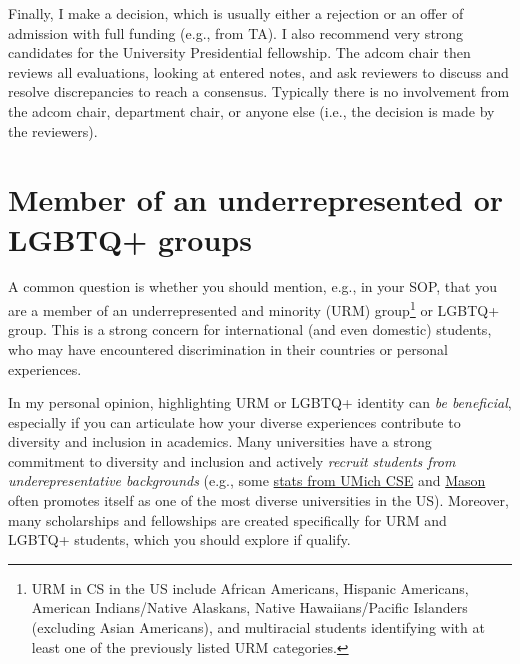 \documentclass[oneside,11pt,dvipsnames]{book}
\begin{document}
Finally, I make a decision, which is usually either a rejection or an offer of admission with full funding (e.g., from TA). I also recommend very strong candidates for the University Presidential fellowship. The adcom chair then reviews all evaluations, looking at entered notes, and ask reviewers to discuss and resolve discrepancies to reach a consensus. Typically there is no involvement from the adcom chair, department chair, or anyone else (i.e., the decision is made by the reviewers).



\section{Member of an underrepresented or LGBTQ+ groups}\label{sec:urm}

A common question is whether you should mention, e.g., in your SOP, that you are a member of an underrepresented and minority (URM) group\footnote{URM in CS in the US include African Americans, Hispanic Americans, American Indians/Native Alaskans, Native Hawaiians/Pacific Islanders (excluding Asian Americans), and multiracial students identifying with at least one of the previously listed URM categories.} or LGBTQ+ group.
This is a strong concern for international (and even domestic) students, who may have encountered discrimination in their countries or personal experiences.

In my personal opinion, highlighting URM or LGBTQ+ identity can \emph{be beneficial}, especially if you can articulate how your diverse experiences contribute to diversity and inclusion in academics.  Many universities have a strong commitment to diversity and inclusion and actively
\emph{recruit students from underepresentative backgrounds} (e.g., some \href{https://cse-climate.engin.umich.edu/reports/climate-dei-reports/cse-climate-and-dei-report-2022-2023/#grad-ethnicity}{stats from UMich CSE} and \href{https://www.Mason.edu/news/2022-09/mason-now-top-10-public-university-diversity-innovation-and-cybersecurity-education-us}{Mason} often promotes itself as one of the most diverse universities in the US). Moreover, many scholarships and fellowships are created specifically for URM and LGBTQ+ students, which you should explore if qualify.
\end{document}
